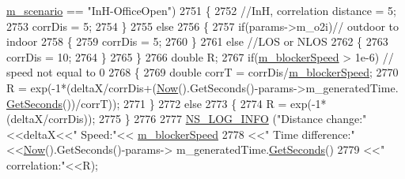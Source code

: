 \begin{DoxyCode}
      \hyperlink{classns3_1_1MmWave3gppChannel_ae1f263fbc87682905d563221343e4447}{m\_scenario} == \textcolor{stringliteral}{"InH-OfficeOpen"})
2751                         \{
2752                                 \textcolor{comment}{//InH, correlation distance = 5;}
2753                                 corrDis = 5;
2754                         \}
2755                         \textcolor{keywordflow}{else}
2756                         \{
2757                                 \textcolor{keywordflow}{if}(params->m\_o2i)\textcolor{comment}{// outdoor to indoor}
2758                                 \{
2759                                         corrDis = 5;
2760                                 \}
2761                                 \textcolor{keywordflow}{else} \textcolor{comment}{//LOS or NLOS}
2762                                 \{
2763                                         corrDis = 10;
2764                                 \}
2765                         \}
2766                         \textcolor{keywordtype}{double} R;
2767                         \textcolor{keywordflow}{if}(\hyperlink{classns3_1_1MmWave3gppChannel_a5d7b7b759283cdf9a6781571e9eeca25}{m\_blockerSpeed} > 1e-6) \textcolor{comment}{// speed not equal to 0}
2768                         \{
2769                                 \textcolor{keywordtype}{double} corrT = corrDis/\hyperlink{classns3_1_1MmWave3gppChannel_a5d7b7b759283cdf9a6781571e9eeca25}{m\_blockerSpeed};
2770                                 R = exp(-1*(deltaX/corrDis+(\hyperlink{group__simulator_gac3635e2e87f7ce316c89290ee1b01d0d}{Now}().GetSeconds()-params->m\_generatedTime.
      \hyperlink{classns3_1_1Time_a8f20d5c3b0902d7b4320982f340b57c8}{GetSeconds}())/corrT));
2771                         \}
2772                         \textcolor{keywordflow}{else}
2773                         \{
2774                                 R = exp(-1*(deltaX/corrDis));
2775                         \}
2776 
2777                         \hyperlink{group__logging_gafbd73ee2cf9f26b319f49086d8e860fb}{NS\_LOG\_INFO} (\textcolor{stringliteral}{"Distance change:"}<<deltaX<<\textcolor{stringliteral}{" Speed:"}<<
      \hyperlink{classns3_1_1MmWave3gppChannel_a5d7b7b759283cdf9a6781571e9eeca25}{m\_blockerSpeed}
2778                                         <<\textcolor{stringliteral}{" Time difference:"}<<\hyperlink{group__simulator_gac3635e2e87f7ce316c89290ee1b01d0d}{Now}().GetSeconds()-params->
      m\_generatedTime.\hyperlink{classns3_1_1Time_a8f20d5c3b0902d7b4320982f340b57c8}{GetSeconds}()
2779                                         <<\textcolor{stringliteral}{" correlation:"}<<R);

\end{DoxyCode}
